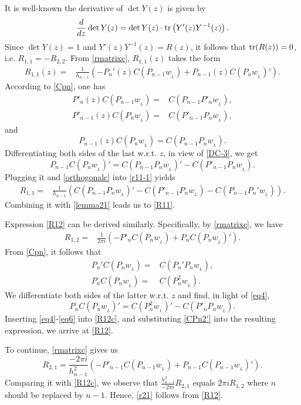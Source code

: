 \documentclass[12pt,a4paper]{article}    %
\makeatletter
\renewenvironment{proof}[1][\proofname]{\par
	\pushQED{\qed}%
	\normalfont \topsep6\p@\@plus6\p@\relax
	\trivlist
	\item[\hskip\labelsep
	\itshape #1\@addpunct{.}]\ignorespaces
}{%
	\popQED\endtrivlist\@endpefalse
}
\def\tr {{\rm tr}}
\numberwithin{equation}{section}
\makeatother
\begin{document}
\begin{proof}
It is well-known the derivative of $\det Y(z)$ is given by \cite[(0.8.10.1)]{HJ}
\[\frac{d}{dz} \det Y(z)=\det Y(z)\cdot \tr\left(Y'(z)Y^{-1}(z)\right).\]
Since $\det Y(z)=1$ and $Y'(z)Y^{-1}(z)=R(z)$, it follows that $\tr(R(z))=0$, i.e. $R_{1,1}=-R_{2,2}$. From \eqref{rmatrixc}, $R_{1,1}(z)$ takes the form
\begin{align}\label{r11-1}			 R_{1,1}(z)=&\frac{1}{h_{n-1}}\left(-P_n'(z)C(P_{n-1}w_{_L})+P_{n-1}(z)C(P_nw_{_L})'\right).		 		 \end{align}	
According to \eqref{Cpn}, one has
\begin{align}	 P'_{n}(z)C(P_{n-1}w_{_{L}})=&C(P_{n-1}P'_{n}w_{_{L}}),\label{orthogonalc}	 \\
P'_{n-1}(z)C(P_{n}w_{_{L}})=&C(P'_{n-1}P_{n}w_{_{L}}),\label{DC-3}
\end{align}
	and
	\begin{equation*}	 P_{n-1}(z)C(P_{n}w_{_{L}})=C(P_{n-1}P_{n}w_{_{L}}).
	\end{equation*}
Differentiating both sides of the last w.r.t. $z$, in view of \eqref{DC-3}, we get
	\begin{equation*}	 P_{n-1}C(P_{n}w_{_{L}})'=C(P_{n-1}P_{n}w_{_{L}})'-C(P'_{n-1}P_{n}w_{_{L}}).
	\end{equation*}
Plugging it and \eqref{orthogonalc} into \eqref{r11-1} yields
\begin{align*}			 R_{1,1}=&\frac{1}{h_{n-1}}\left(C(P_{n-1}P_nw_{_L})'-C(P'_{n-1}P_nw_{_L})-C(P_{n-1}P_n'w_{_L})\right).
\end{align*}
Combining it with \eqref{lemma21} leads us to \eqref{R11}.
	
Expression \eqref{R12} can be derived similarly. Specifically, by \eqref{rmatrixc}, we have
\begin{align}\label{R12c}
R_{1,2}=&\frac{1}{2\pi i}\left(-P'_nC(P_nw_{_L})+P_nC(P_nw_{_L})'\right).
\end{align}
From \eqref{Cpn}, it follows that
\begin{align}
P_n'C(P_nw_{_L})=&C(P_n'P_nw_{_L}),\label{eq4}\\
P_nC(P_nw_{_L})=&C(P_{n}^{2}w_{_L}).\nonumber
\end{align}
We differentiate both sides of the latter w.r.t. $z$ and find, in light of \eqref{eq4},
	 \begin{equation}\label{eq6}	 	 P_nC(P_nw_{_L})'=C(P_{n}^{2}w_{_L})'-C(P'_nP_nw_{_L}).
	 \end{equation}
Inserting \eqref{eq4}-\eqref{eq6} into \eqref{R12c}, and substituting \eqref{CPn2'} into the resulting expression, we arrive at \eqref{R12}.

To continue, \eqref{rmatrixc} gives us
	\begin{equation*}
    R_{2,1}=\frac{-2\pi i}{h_{n-1}^{2}}\left(-P'_{n-1}C(P_{n-1}w_{_L})+P_{n-1}C(P_{n-1}w_{_L})'\right).		 \end{equation*}
Comparing it with \eqref{R12c}, we observe that $\frac{h_{n-1}^2}{-2\pi i}R_{2,1}$ equals $2\pi i R_{1,2}$ where $n$ should be replaced by $n-1$. Hence, \eqref{r21} follows from \eqref{R12}.
\end{proof}
	
\end{document}
